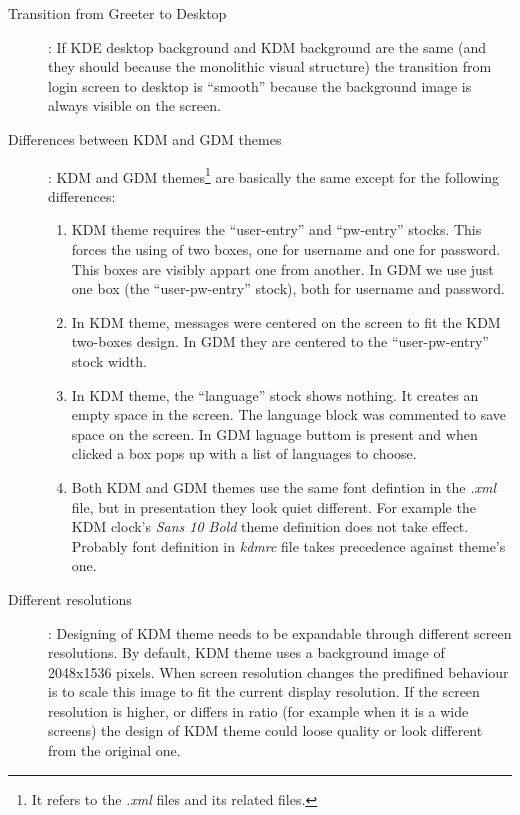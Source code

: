 \documentclass{article}
\begin{document}
\begin{description}

\item[Transition from Greeter to Desktop]: If KDE desktop background
and KDM background are the same (and they should because the
monolithic visual structure) the transition from login screen to
desktop is ``smooth'' because the background image is always visible
on the screen.

\item[Differences between KDM and GDM themes]: KDM and GDM
themes\footnote{It refers to the \emph{.xml} files and its related
files.} are basically the same except for the following differences:

\begin{enumerate}

\item KDM theme requires the ``user-entry'' and ``pw-entry'' stocks.
This forces the using of two boxes, one for username and one for
password. This boxes are visibly appart one from another. In GDM we
use just one box (the ``user-pw-entry'' stock), both for
username and password.

\item In KDM theme, messages were centered on the screen to fit the
KDM two-boxes design. In GDM they are centered to the
``user-pw-entry'' stock width.

\item In KDM theme, the ``language'' stock shows nothing. It creates
an empty space in the screen. The language block was commented to save
space on the screen. In GDM laguage buttom is present and when clicked
a box pops up with a list of languages to choose.

\item Both KDM and GDM themes use the same font defintion in the
\emph{.xml} file, but in presentation they look quiet different. For
example the KDM clock's \emph{Sans 10 Bold} theme definition does not
take effect. Probably font definition in \emph{kdmrc} file takes
precedence against theme's one.

\end{enumerate}

\item[Different resolutions]: Designing of KDM theme needs to be
expandable through different screen resolutions. By default, KDM theme
uses a background image of 2048x1536 pixels. When screen resolution
changes the predifined behaviour is to scale this image to fit the
current display resolution. If the screen resolution is higher, or
differs in ratio (for example when it is a wide screens) the design of
KDM theme could loose quality or look different from the original one.


\end{description}
\end{document}
